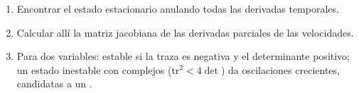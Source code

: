 \begin{method}\label{met:b3:complex-kinetics:stability}
\begin{enumerate}
  \item Encontrar el estado estacionario anulando todas las derivadas temporales.
  \item Calcular allí la matriz jacobiana de las derivadas parciales de las velocidades.
  \item Para dos variables: estable si la traza es negativa y el determinante
        positivo; un estado inestable con  complejos
        ($\mathrm{tr}^2 < 4\det$) da oscilaciones crecientes, candidatas a un .
\end{enumerate}
\end{method}

